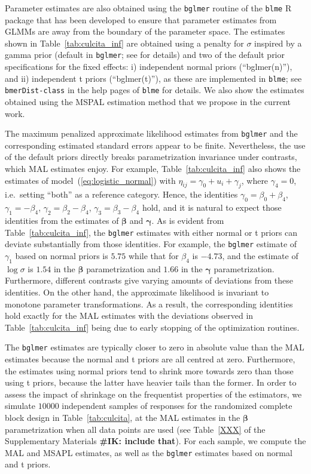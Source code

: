 \documentclass[11pt, a4paper]{article}
\newcommand*{\bb}{\boldsymbol}
\newcommand{\IK}[1]{{\noindent \color{blue} \bf \#IK: #1}}
\theoremstyle{example} \newtheorem{example}{Example}[section]
\theoremstyle{theorem} \newtheorem{theorem}{Theorem}[section]
\def\bbeta{\bb{\beta}}
\def\bgamma{\bb{\gamma}}
\def\bgamma{\bb{\gamma}}
\begin{document}
Parameter estimates are also obtained using the \texttt{bglmer}
routine of the \texttt{blme} R package \citep{blme} that has
been developed to ensure that parameter estimates from GLMMs are away
from the boundary of the parameter space. The estimates shown in
Table~\ref{tab:culcita_inf} are obtained using a penalty for $\sigma$
inspired by a gamma prior (default in \texttt{bglmer}; see
\citealt{blme} for details) and two of the default prior
specifications for the fixed effects: i) independent normal priors
(``bglmer(n)''), and ii) independent t priors (``bglmer(t)''), as
these are implemented in \texttt{blme}; see \texttt{bmerDist-class} in
the help pages of \texttt{blme} for details. We also show the
estimates obtained using the MSPAL estimation method that we propose
in the current work.

The maximum penalized approximate likelihood estimates from
\texttt{bglmer} and the corresponding estimated standard errors appear to
be finite. Nevertheless, the use of the default priors directly breaks
parametrization invariance under contrasts, which MAL estimates
enjoy. For example, Table~\ref{tab:culcita_inf} also shows the
estimates of model~(\ref{eq:logistic_normal}) with
$\eta_{ij} = \gamma_0 + u_i + \gamma_{j}$, where $\gamma_{4} = 0$,
i.e.~setting ``both'' as a reference category. Hence, the identities
$\gamma_0 = \beta_0 + \beta_4$, $\gamma_1 = -\beta_4$,
$\gamma_2 = \beta_2 - \beta_4$, $\gamma_3 = \beta_3 - \beta_4$ hold,
and it is natural to expect those identities from the estimates of
$\bbeta$ and $\bgamma$. As is evident from
Table~\ref{tab:culcita_inf}, the \texttt{bglmer} estimates with either
normal or t priors can deviate substantially from those
identities. For example, the \texttt{bglmer} estimate of $\gamma_1$
based on normal priors is $5.75$ while that for $\beta_4$ is $-4.73$,
and the estimate of $\log\sigma$ is $1.54$ in the $\bbeta$
parametrization and $1.66$ in the $\bgamma$
parametrization. Furthermore, different contrasts give varying
amounts of deviations from these identities. On the other hand, the
approximate likelihood is invariant to monotone parameter
transformations. As a result, the corresponding identities hold
exactly for the MAL estimates with the deviations observed in
Table~\ref{tab:culcita_inf} being due to early stopping of the optimization routines.

The \texttt{bglmer} estimates are typically closer to zero in absolute
value than the MAL estimates because the normal and t priors are all
centred at zero. Furthermore, the estimates using normal priors tend
to shrink more towards zero than those using t priors, because the
latter have heavier tails than the former. In order to assess the
impact of shrinkage on the frequentist properties of the estimators,
we simulate $10000$ independent samples of responses for the randomized
complete block design in Table~\ref{tab:culcita}, at the MAL estimates
in the $\bbeta$ parametrization when all data points are used (see
Table~\ref{XXX} of the Supplementary Materials  \IK{include that}). For each sample, we
compute the MAL and MSAPL estimates, as well as the \texttt{bglmer} estimates based on
normal and t priors.
\end{document}
